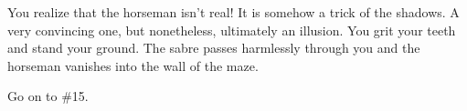 \documentclass[green]{gl2018}
\begin{document}
\begin{large}
\begin{location}{44}
You realize that the horseman isn't real! It is somehow a trick of the shadows. A very convincing one, but nonetheless, ultimately an illusion. You grit your teeth and stand your ground. The sabre passes harmlessly through you and the horseman vanishes into the wall of the maze. 
\begin{fromhere} Go on to \#15.\end{fromhere}
\end{location}
\end{large}
\end{document}
